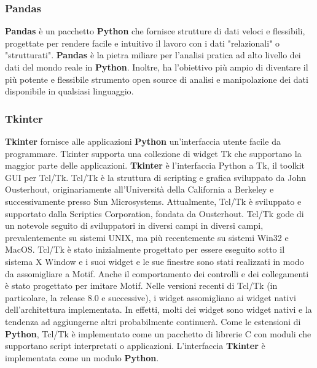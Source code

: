 \subsubsection{Pandas}
\textbf{Pandas} è un pacchetto \textbf{Python} che fornisce strutture di dati veloci e flessibili, progettate per rendere facile e intuitivo il lavoro con i dati "relazionali" o "strutturati". \textbf{Pandas} è la pietra miliare per l'analisi pratica ad alto livello dei dati del mondo reale in \textbf{Python}. Inoltre, ha l'obiettivo più ampio di diventare il più potente e flessibile strumento open source di analisi e manipolazione dei dati disponibile in qualsiasi linguaggio\cite{reback2020pandas}. 

\subsubsection{Tkinter}
\textbf{Tkinter} fornisce alle applicazioni \textbf{Python} un'interfaccia utente facile da programmare. Tkinter supporta una collezione di widget Tk che supportano la maggior parte delle applicazioni. \textbf{Tkinter} è l'interfaccia Python a Tk, il toolkit GUI per Tcl/Tk. Tcl/Tk è la struttura di scripting e grafica sviluppato da John Ousterhout, originariamente all'Università della California a Berkeley e successivamente presso Sun Microsystems. Attualmente, Tcl/Tk è sviluppato e supportato dalla Scriptics Corporation, fondata da Ousterhout. Tcl/Tk gode di un notevole seguito di sviluppatori in diversi campi in diversi campi, prevalentemente su sistemi UNIX, ma più recentemente su sistemi Win32 e MacOS.\newline
Tcl/Tk è stato inizialmente progettato per essere eseguito sotto il sistema X Window e i suoi widget e le sue finestre sono stati realizzati in modo da assomigliare a Motif. Anche il comportamento dei controlli e dei collegamenti è stato progettato per imitare Motif. Nelle versioni recenti di Tcl/Tk (in particolare, la release 8.0 e successive), i widget assomigliano ai widget nativi dell'architettura implementata. In effetti, molti dei widget sono widget nativi e la tendenza ad aggiungerne altri probabilmente continuerà. Come le estensioni di \textbf{Python}, Tcl/Tk è implementato come un pacchetto di librerie C con moduli che supportano script interpretati o applicazioni. L'interfaccia \textbf{Tkinter} è implementata come un modulo \textbf{Python}\cite{grayson2000python}.

